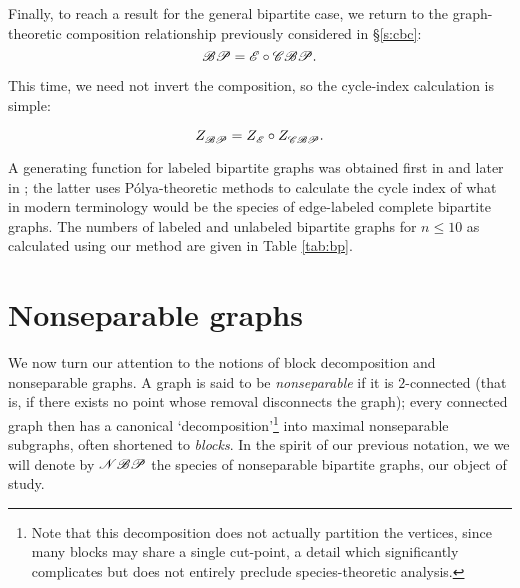 \documentclass[sectionflow,singlespace,twoside,boldmathhdr,draft]{brandiss} %
\numberwithin{section}{chapter}
\numberwithin{figure}{chapter}
\begin{document}
Finally, to reach a result for the general bipartite case, we return to the graph-theoretic composition relationship previously considered in \S \ref{s:cbc}:
\begin{equation*}
  \mathscr{BP} = \mathscr{E} \circ \mathscr{CBP}.
\end{equation*}

This time, we need not invert the composition, so the cycle-index calculation is simple:
\begin{theorem}
  \begin{equation}
     Z_{\mathscr{BP}}^{}  =  Z_{\mathscr{E}}^{}  \circ  Z_{\mathscr{CBP}}^{} .
  \end{equation}
\end{theorem}

A generating function for labeled bipartite graphs was obtained first in \cite{harprins:bipartite} and later in \cite{han:bipartite}; the latter uses P\'{o}lya-theoretic methods to calculate the cycle index of what in modern terminology would be the species of edge-labeled complete bipartite graphs.
The numbers of labeled and unlabeled bipartite graphs for $n \leq 10$ as calculated using our method are given in Table \ref{tab:bp}.

\section{Nonseparable graphs}\label{s:nbp}
We now turn our attention to the notions of block decomposition and nonseparable graphs.
A graph is said to be \emph{nonseparable} if it is $2$-connected (that is, if there exists no point whose removal disconnects the graph); every connected graph then has a canonical `decomposition'\footnote{Note that this decomposition does not actually partition the vertices, since many blocks may share a single cut-point, a detail which significantly complicates but does not entirely preclude species-theoretic analysis.} into maximal nonseparable subgraphs, often shortened to \emph{blocks}.
In the spirit of our previous notation, we we will denote by $\mathscr{NBP}$ the species of nonseparable bipartite graphs, our object of study.
\end{document}
